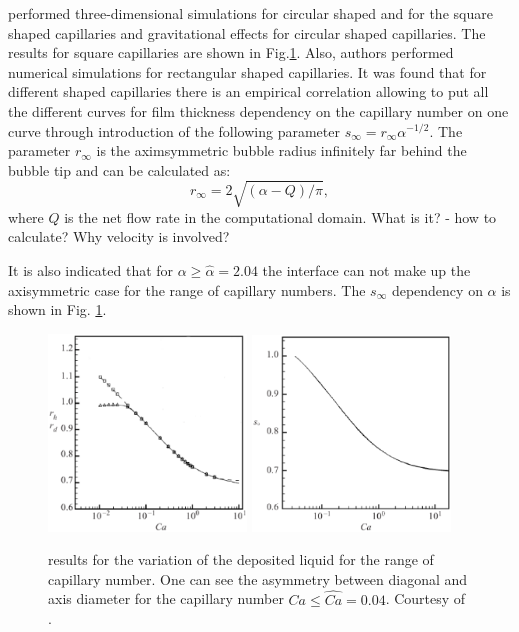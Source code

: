\documentclass{article}
\begin{document}
\citet{heil-threedim} performed three-dimensional simulations for circular shaped and for the
square shaped capillaries and gravitational effects for circular shaped capillaries. The results for
square capillaries are shown in Fig.\ref{fig:heil:three:dim}. Also, authors performed
numerical simulations for rectangular shaped capillaries. It was found that for different shaped
capillaries there is an empirical correlation allowing to put all the different curves for film
thickness dependency on the capillary number on one curve through introduction of the following
parameter
$s_{\infty}=r_{\infty} \alpha^{-1/2}$. The parameter $r_{\infty}$ is the aximsymmetric bubble radius
infinitely far behind the bubble tip and can be calculated as:
\begin{equation}
r_{\infty}=2\sqrt{(\alpha-Q)/\pi},
\end{equation}
where $Q$ is the net flow rate in the computational domain. {\color{red} What is it? - how to
calculate? Why velocity is involved?}

It is also indicated that for $\alpha\geq\hat{\alpha}=2.04$ the interface can not make up the
axisymmetric case for the range of capillary numbers. The $s_{\infty}$ dependency on $\alpha$ is
shown in Fig.
\ref{fig:heil:three:dim}.
\begin{figure}
\includegraphics[width=0.47\textwidth]{Figures/capillary_width_heil.eps}\hfill
\includegraphics[width=0.47\textwidth]{Figures/capillary_rectangular_width_heil.eps}\\
\caption{\citet{heil-threedim} results for the variation of the deposited liquid for the range of
capillary number. One can see the asymmetry between diagonal and axis diameter for the capillary
number $Ca\leq\hat{Ca}=0.04$. Courtesy of \citet{heil-threedim}. \label{fig:heil:three:dim}}
\end{figure}
\end{document}
